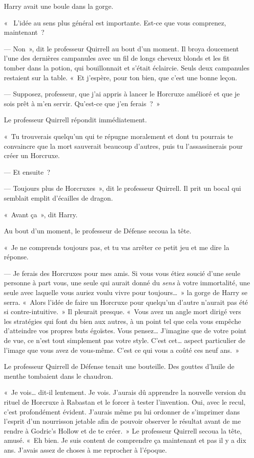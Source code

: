 Harry avait une boule dans la gorge.

«~ L'idée au sens plus général est importante.
Est-ce que vous comprenez, maintenant~?

--- Non~», dit le professeur Quirrell au bout d'un moment.
Il broya doucement l'une des dernières campanules avec un fil de longs cheveux blonds et les fit tomber dans la potion, qui bouillonnait et s'était éclaircie.
Seuls deux campanules restaient sur la table.
«~Et j'espère, pour ton bien, que c'est une bonne leçon.

--- Supposez, professeur, que j'ai appris à lancer le Horcruxe amélioré et que je sois prêt à m'en servir.
Qu'est-ce que j'en ferais~?~»

Le professeur Quirrell répondit immédiatement.

«~Tu trouverais quelqu'un qui te répugne moralement et dont tu pourrais te convaincre que la mort sauverait beaucoup d'autres, puis tu l'assassinerais pour créer un Horcruxe.

--- Et ensuite~?

--- Toujours plus de Horcruxes~», dit le professeur Quirrell.
Il prit un bocal qui semblait emplit d'écailles de dragon.

«~Avant ça~», dit Harry.

Au bout d'un moment, le professeur de Défense secoua la tête.

«~Je ne comprends toujours pas, et tu vas arrêter ce petit jeu et me dire la réponse.

--- Je ferais des Horcruxes pour mes amis.
Si vous vous étiez soucié d'une seule personne à part vous, une seule qui aurait donné du \emph{sens} à votre immortalité, une seule avec laquelle vous auriez voulu vivre pour toujours…~»
la gorge de Harry se serra.
«~Alors l'idée de faire un Horcruxe pour quelqu'un d'autre n'aurait pas été si contre-intuitive.~»
Il pleurait presque.
«~Vous avez un angle mort dirigé vers les stratégies qui font du bien aux autres, à un point tel que cela vous empêche d'atteindre vos propres buts égoïstes.
Vous pensez…
J'imagine que de votre point de vue, ce n'est tout simplement pas votre style.
C'est cet… aspect particulier de l'image que vous avez de vous-même.
C'est ce qui vous a coûté ces neuf ans.~»

Le professeur Quirrell de Défense tenait une bouteille.
Des gouttes d'huile de menthe tombaient dans le chaudron.

«~Je vois… dit-il lentement.
Je vois.
J'aurais dû apprendre la nouvelle version du rituel de Horcruxe à Rabastan et le forcer à tester l'invention.
Oui, avec le recul, c'est profondément évident.
J'aurais même pu lui ordonner de s'imprimer dans l'esprit d'un nourrisson jetable afin de pouvoir observer le résultat avant de me rendre à Godric's Hollow et de te créer.~»
Le professeur Quirrell secoua la tête, amusé.
«~Eh bien.
Je suis content de comprendre ça maintenant et pas il y a dix ans.
J'avais assez de choses à me reprocher à l'époque.

